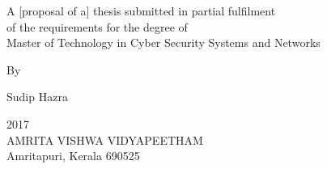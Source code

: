 \thispagestyle{empty}
\begin{center}

{\bf\Huge \thesisTitle}

\par\vskip 4cm

A  [proposal of a] thesis submitted in partial fulfilment\\
of the requirements for the degree of\\
Master of Technology in Cyber Security Systems and Networks\\  %

\par\vskip 2cm
By\\
\par\vskip 2cm


Sudip Hazra\\              %


\vfill

2017\\                          %
AMRITA VISHWA VIDYAPEETHAM\\
Amritapuri, Kerala 690525\\


\end{center}

\newpage


